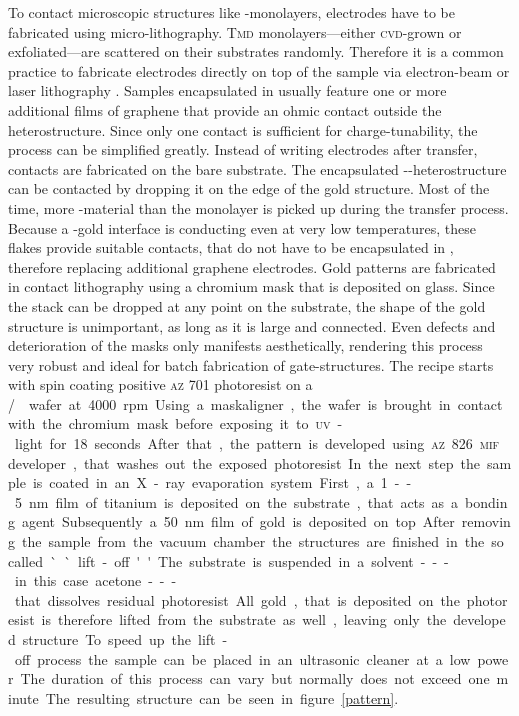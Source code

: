 To contact microscopic structures like \tmd-monolayers, electrodes have to be fabricated using micro-lithography. \textsc{Tmd} monolayers---either \textsc{cvd}-grown or exfoliated---are scattered on their substrates randomly. Therefore it is a common practice to fabricate electrodes directly on top of the sample via electron-beam or laser lithography  \cite{wang_electronic_2015, fallahazad_shubnikovhaas_2016}. Samples encapsulated in \hbng usually feature one or more additional films of graphene that provide an ohmic contact outside the heterostructure. Since only one contact is sufficient for charge-tunability, the process can be simplified greatly. Instead of writing electrodes after transfer, contacts are fabricated on the bare substrate. The encapsulated \hbn-\tmd-heterostructure can be contacted by dropping it on the edge of the gold structure. Most of the time, more \tmd-material than the monolayer is picked up during the transfer process. Because a \tmd-gold interface is conducting even at very low temperatures, these flakes provide suitable contacts, that do not have to be encapsulated in \hbn, therefore replacing additional graphene electrodes. Gold patterns are fabricated in contact lithography using a chromium mask that is deposited on glass. Since the stack can be dropped at any point on the substrate, the shape of the gold structure is unimportant, as long as it is large and connected. Even defects and deterioration of the masks only manifests aesthetically, rendering this process very robust and ideal for batch fabrication of gate-structures. The recipe starts with spin coating positive \textsc{az} 701 photoresist on a \si/\sio wafer at 4000 rpm. Using a maskaligner, the wafer is brought in contact with the chromium mask before exposing it to \textsc{uv}-light for 18 seconds. After that, the pattern is developed using \textsc{az} 826 \textsc{mif} developer, that washes out the exposed photoresist.

In the next step the sample is coated in an X-ray evaporation system. First, a 1--5 nm film of titanium is deposited on the substrate, that acts as a bonding agent. Subsequently a 50 nm film of gold is deposited on top. After removing the sample from the vacuum chamber the structures are finished in the so called ``lift-off''. The substrate is suspended in a solvent---in this case acetone---that dissolves residual photoresist. All gold, that is deposited on the photoresist is therefore lifted from the substrate as well, leaving only the developed structure. To speed up the lift-off process the sample can be placed in an ultrasonic cleaner at a low power. The duration of this process can vary but normally does not exceed one minute. The resulting structure can be seen in figure \ref{pattern}. 

